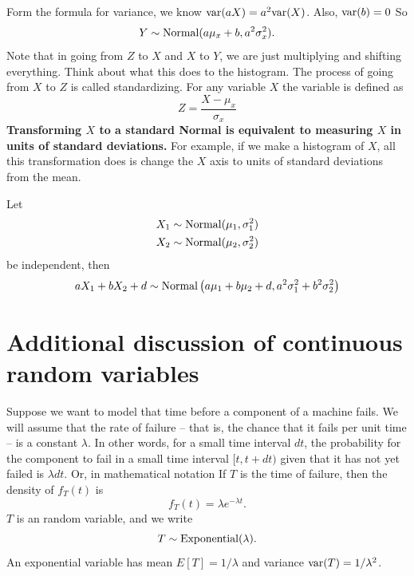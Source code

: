 Form the formula for variance, we know ${\rm var}(aX)  = a^2{\rm var}(X)$. Also, ${\rm var}(b) =0$
So 
\begin{equation*}\label{eq:normal_linear_trans}
Y \sim {\rm Normal}(a\mu_x + b,a^2\sigma_x^2).
\end{equation*}
Note that in going from $Z$ to $X$ and $X$ to $Y$, we are just multiplying and shifting everything.
Think about what this does to the histogram. 
 The process of going from $X$ to $Z$ is called standardizing. For any variable $X$ the  variable is defined as 
\begin{equation*}
Z = \frac{X-\mu_x}{\sigma_x}
\end{equation*}
 {\bf Transforming $X$ to a standard Normal is equivalent to measuring $X$ in units of standard deviations.} For example, if we make a histogram of $X$, all this transformation does is change the $X$ axis to units of standard deviations from the mean. 

  \begin{thm}\label{thm:addingnormal}
Let
\begin{align*}
X_1 &\sim {\rm Normal}(\mu_1,\sigma_1^2)\\
X_2 &\sim {\rm Normal}(\mu_2,\sigma_2^2)
\end{align*}
be independent, then 
\begin{equation*}
aX_1+bX_2 + d \sim {\rm Normal}\left(a\mu_1+b\mu_2+d,a^2\sigma_1^2 + b^2\sigma_2^2\right)
\end{equation*}
 \end{thm}



\appendix

 \section{Additional discussion of continuous random variables}



 Suppose we want to model that time before a component of a machine fails. We will assume that the rate of failure -- that is, the chance that it fails per unit time -- is a constant $\lambda$. In other words, for a small time interval $dt$, the probability for the component to fail in a small time interval $[t,t+dt)$ given that it has not yet failed is $\lambda dt$. Or, in mathematical notation 
 If $T$ is the time of failure, then the density of $f_T(t)$ is 
\begin{equation*}
f_T(t) = \lambda e^{-\lambda t}.
\end{equation*}
$T$ is an  random variable, and we write
\begin{equation*}
T \sim {\rm Exponential}(\lambda).
\end{equation*}
An exponential variable has mean $E[T] = 1/\lambda$ and variance ${\rm var}(T) = 1/\lambda^2$. 



